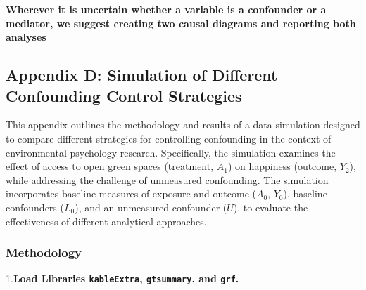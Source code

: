 \documentclass[
  singlecolumn]{article}
\begin{document}
\textbf{Wherever it is uncertain whether a variable is a confounder or a
mediator, we suggest creating two causal diagrams and reporting both
analyses}

\newpage{}

\subsection{Appendix D: Simulation of Different Confounding Control
Strategies}\label{appendix-d}

This appendix outlines the methodology and results of a data simulation
designed to compare different strategies for controlling confounding in
the context of environmental psychology research. Specifically, the
simulation examines the effect of access to open green spaces
(treatment, \(A_1\)) on happiness (outcome, \(Y_2\)), while addressing
the challenge of unmeasured confounding. The simulation incorporates
baseline measures of exposure and outcome (\(A_0\), \(Y_0\)), baseline
confounders (\(L_0\)), and an unmeasured confounder (\(U\)), to evaluate
the effectiveness of different analytical approaches.

\subsubsection{Methodology}\label{methodology-1}

1.\textbf{Load Libraries \texttt{kableExtra}, \texttt{gtsummary}, and
\texttt{grf}.}
\end{document}
